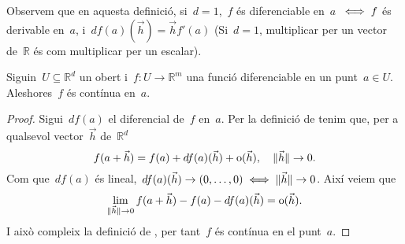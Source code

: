 \documentclass[../../main.tex]{subfiles}
\begin{document}
	\begin{observation}
		\label{obs:diferencial en d=1 és com derivar}
		Observem que en aquesta definició, si~\(d=1\),~\(f\) és diferenciable en~\(a\)~\(\iff f\) és derivable en~\(a\), i~\(df(a)(\vec{h})=\vec{h}f'(a)\) (Si~\(d=1\), multiplicar per un vector de~\(\mathbb{R}\) és com multiplicar per un escalar).
	\end{observation}
	\begin{proposition}
		\label{prop:Diferenciable implica contínua}
		Siguin~\(U\subseteq\mathbb{R}^{d}\) un obert i~\(f\colon U\to\mathbb{R}^{m}\) una funció diferenciable en un punt~\(a\in U\).
		Aleshores~\(f\) és contínua en~\(a\).
		\begin{proof}
			Sigui~\(df(a)\) el diferencial de~\(f\) en~\(a\).
			Per la definició de  tenim que, per a qualsevol vector~\(\vec{h}\) de~\(\mathbb{R}^d\)
			\[
			    f(a+\vec{h})=f(a)+df(a)(\vec{h})+\operatorname{o}(\vec{h}),\quad \lVert\vec{h}\rVert\to0.
			\]
			Com que~\(df(a)\) és lineal,~\(df(a)(\vec{h})\to(0,\dots,0)\iff\lVert\vec{h}\rVert\to0\).
			Així veiem que
			\[
			    \lim_{\lVert\vec{h}\rVert\to0}f(a+\vec{h})-f(a)-df(a)(\vec{h})=\operatorname{o}(\vec{h}).
			\]
			I això compleix la definició de , per tant~\(f\) és contínua en el punt~\(a\).
		\end{proof}
	\end{proposition}
\end{document}
